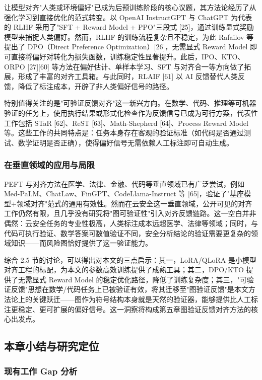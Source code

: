 \documentclass[a4paper,12pt]{ctexart}
\begin{document}
让模型对齐"人类或环境偏好"已成为后预训练阶段的核心议题，其方法论经历了从强化学习到直接优化的范式转变。以 OpenAI InstructGPT 与 ChatGPT 为代表的 RLHF 采用了"SFT + Reward Model + PPO"三段式 [25]，通过训练显式奖励模型来捕捉人类偏好。然而，RLHF 的训练流程复杂且不稳定，为此 Rafailov 等提出了 DPO（Direct Preference Optimization）[26]，无需显式 Reward Model 即可直接将偏好对转化为损失函数，训练稳定性显著提升。此后，IPO、KTO、ORPO [27][60] 等方法在偏好估计、单样本学习、SFT 与对齐合一等方向做了拓展，形成了丰富的对齐工具箱。与此同时，RLAIF [61] 以 AI 反馈替代人类反馈，降低了标注成本，开辟了非人类偏好信号的路径。

特别值得关注的是"可验证反馈对齐"这一新兴方向。在数学、代码、推理等可机器验证的任务上，使用执行结果或形式化检查作为反馈信号已成为可行方案，代表性工作包括 STaR [62]、ReST [63]、Math-Shepherd [64]、Process Reward Model 等。这些工作的共同特点是：任务本身存在客观的验证标准（如代码是否通过测试、数学证明是否正确），使得偏好信号无需依赖人工标注即可自动生成。

\subsubsection{在垂直领域的应用与局限}

PEFT 与对齐方法在医学、法律、金融、代码等垂直领域已有广泛尝试，例如 Med-PaLM、ChatLaw、FinGPT、CodeLlama-Instruct 等 [65]，验证了"基座模型+领域对齐"范式的通用有效性。然而在云安全这一垂直领域，公开可见的对齐工作仍然有限，且几乎没有研究将"图可验证性"引入对齐反馈链路。这一空白并非偶然：云安全任务的专业性极高，人类标注成本远超医学、法律等领域；同时，与代码可执行验证、数学答案可数值验证不同，安全分析结论的验证需要更复杂的领域知识——而风险图恰好提供了这一验证能力。

综合 2.5 节的讨论，可以得出对本文的三点启示：其一，LoRA/QLoRA 是小模型对齐工程的标配，为本文的参数高效训练提供了成熟工具；其二，DPO/KTO 提供了无需显式 Reward Model 的稳定优化路径，降低了训练复杂度；其三，"可验证反馈"思想在数学/代码任务上已被验证有效，将其迁移至"图验证反馈"是本文方法论上的关键跃迁——图作为符号结构本身就是天然的验证器，能够提供比人工标注更稳定、更可扩展的偏好信号。这一洞察将构成第五章图验证反馈对齐方法的核心出发点。

\subsection{本章小结与研究定位}

\subsubsection{现有工作 Gap 分析}
\end{document}
